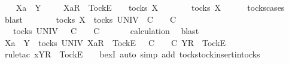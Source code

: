 \isamarkupfalse%
\isanewline
\ \ \isamarkupfalse%
\ Xa\ {\isasymrho}\ Y\ {\isasymsigma}\isanewline
\ \ \isamarkupfalse%
\ {\isachardoublequoteopen}{\isacharbrackleft}Xa{\isacharbrackright}\isactrlsub R\ {\isacharhash}\ {\isacharbrackleft}Tock{\isacharbrackright}\isactrlsub E\ {\isacharhash}\ {\isasymrho}\ {\isasymin}\ tocks\ X{\isachardoublequoteclose}\isanewline
\ \ \isamarkupfalse%
\ \isamarkupfalse%
\ {\isachardoublequoteopen}{\isasymrho}\ {\isasymin}\ tocks\ X{\isachardoublequoteclose}\isanewline
\ \ \ \ \isamarkupfalse%
\ tocks{\isachardot}cases\ \isamarkupfalse%
\ blast\isanewline
\ \ \isamarkupfalse%
\ \isamarkupfalse%
\ {\isachardoublequoteopen}{\isasymrho}\ {\isasymin}\ tocks\ X\ {\isasymLongrightarrow}\ {\isasymexists}{\isasymrho}{\isacharprime}{\isasymin}tocks\ UNIV{\isachardot}\ {\isasymrho}\ {\isasymsubseteq}\isactrlsub C\ {\isasymrho}{\isacharprime}\ {\isasymand}\ {\isasymrho}{\isacharprime}\ {\isasymle}\isactrlsub C\ {\isasymsigma}{\isachardoublequoteclose}\isanewline
\ \ \isamarkupfalse%
\ \isamarkupfalse%
\ {\isasymrho}{\isacharprime}\ \ {\isachardoublequoteopen}{\isasymrho}{\isacharprime}{\isasymin}tocks\ UNIV\ {\isasymand}\ {\isasymrho}\ {\isasymsubseteq}\isactrlsub C\ {\isasymrho}{\isacharprime}\ {\isasymand}\ {\isasymrho}{\isacharprime}\ {\isasymle}\isactrlsub C\ {\isasymsigma}{\isachardoublequoteclose}\isanewline
\ \ \ \ \isamarkupfalse%
\ calculation\ \isamarkupfalse%
\ blast\isanewline
\ \ \isamarkupfalse%
\ \isamarkupfalse%
\ {\isachardoublequoteopen}Xa\ {\isasymsubseteq}\ Y\ {\isasymLongrightarrow}\ {\isasymexists}{\isasymrho}{\isacharprime}{\isasymin}tocks\ UNIV{\isachardot}\ {\isacharbrackleft}Xa{\isacharbrackright}\isactrlsub R\ {\isacharhash}\ {\isacharbrackleft}Tock{\isacharbrackright}\isactrlsub E\ {\isacharhash}\ {\isasymrho}\ {\isasymsubseteq}\isactrlsub C\ {\isasymrho}{\isacharprime}\ {\isasymand}\ {\isasymrho}{\isacharprime}\ {\isasymle}\isactrlsub C\ {\isacharbrackleft}Y{\isacharbrackright}\isactrlsub R\ {\isacharhash}\ {\isacharbrackleft}Tock{\isacharbrackright}\isactrlsub E\ {\isacharhash}\ {\isasymsigma}{\isachardoublequoteclose}\isanewline
\ \ \ \ \isamarkupfalse%
\ {\isacharparenleft}rule{\isacharunderscore}tac\ x{\isacharequal}{\isachardoublequoteopen}{\isacharbrackleft}Y{\isacharbrackright}\isactrlsub R\ {\isacharhash}\ {\isacharbrackleft}Tock{\isacharbrackright}\isactrlsub E\ {\isacharhash}\ {\isasymrho}{\isacharprime}{\isachardoublequoteclose}\ \ bexI{\isacharcomma}\ auto\ simp\ add{\isacharcolon}\ tocks{\isachardot}tock{\isacharunderscore}insert{\isacharunderscore}in{\isacharunderscore}tocks{\isacharparenright}\isanewline
